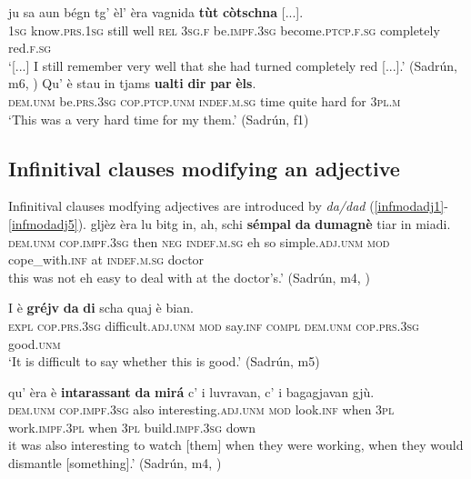 \ea\label{ex:tut2}
\gll    [...] ju sa aun bégn tg’ èl’ èra vagnida \textbf{tùt} \textbf{còtschna} [...].\\
{} \textsc{1sg} know.\textsc{prs.1sg} still well \textsc{rel} \textsc{3sg.f} be.\textsc{impf.3sg} become.\textsc{ptcp.f.sg} completely red.\textsc{f.sg} \\
\glt `[...] I still remember very well that she had turned completely red [...].' (Sadrún, m6, )
\z
\ea
\label{ex:ualtidir}
\gll  Qu’ è stau in tjams \textbf{ualti} \textbf{dir} \textbf{par} \textbf{èls}. \\
\textsc{dem.unm} be.\textsc{prs.3sg} \textsc{cop.ptcp.unm} \textsc{indef.m.sg} time quite hard for \textsc{3pl.m}\\
\glt `This was a very hard time for my them.' (Sadrún, f1)
\z


\subsection{Infinitival clauses modifying an adjective}\label{sec:3.3.4}
Infinitival clauses modfying adjectives are introduced by \textit{da/dad} (\ref{infmodadj1}-\ref{infmodadj5}).
\ea
\label{infmodadj1}
\gll  [...] gljèz èra lu bitg in, ah, schi \textbf{sémpal} \textbf{da} \textbf{dumagnè} tiar in miadi. \\
 {} \textsc{dem.unm} \textsc{cop.impf.3sg} then \textsc{neg} \textsc{indef.m.sg} eh so simple.\textsc{adj.unm} \textsc{mod} cope\_with.\textsc{inf} at \textsc{indef.m.sg} doctor\\
\glt [...] this was not eh easy to deal with at the doctor’s.' (Sadrún, m4, )
\z 

\ea
\label{infmodadj2}
\gll I è \textbf{gréjv} \textbf{da} \textbf{di} scha quaj è bian.\\
\textsc{expl} \textsc{cop.prs.3sg} difficult.\textsc{adj.unm} \textsc{mod} say.\textsc{inf} \textsc{compl} \textsc{dem.unm} \textsc{cop.prs.3sg} good.\textsc{unm}\\
\glt `It is difficult to say whether this is good.' (Sadrún, m5)
\z

\ea
\label{infmodadj3}
\gll  [...] qu' èra è \textbf{intarassant} \textbf{da} \textbf{mirá} c’ i luvravan, c' i bagagjavan gjù.  \\
{} \textsc{dem.unm} \textsc{cop.impf.3sg} also interesting.\textsc{adj.unm} \textsc{mod} look.\textsc{inf} when \textsc{3pl} work.\textsc{impf.3pl} when \textsc{3pl} build.\textsc{impf.3sg} down\\
\glt [...] it was also interesting to watch [them] when they were working, when they would dismantle [something].' (Sadrún, m4, )
\z

